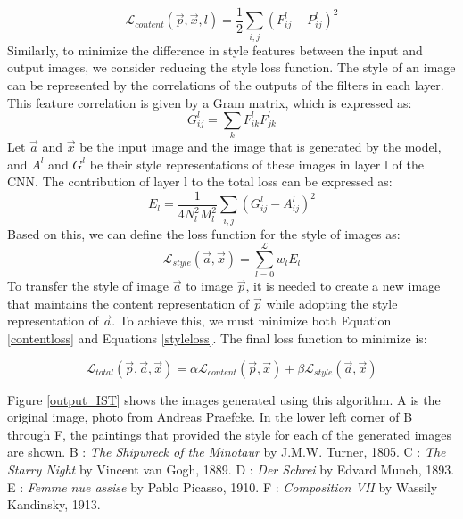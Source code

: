 \begin{equation}
    \label{contentloss}
    \mathcal{ L}_{content}(\vec{p}, \vec{x}, l)=\frac{1}{2} \sum_{i, j}\left(F_{i j}^l-P_{i j}^l\right)^2
\end{equation}
Similarly, to minimize the difference in style features between the input and
output images, we consider reducing the style loss function. The style of an 
image can be represented by the correlations of the outputs of the filters in 
each layer. This feature correlation is given by a Gram matrix, which is 
expressed as:
\begin{equation}
    G_{i j}^l = \sum_k F_{i k}^l F_{j k}^l 
\end{equation}
Let $\vec{a}$ and $\vec{x}$ be the input image and the image that is generated by
the model, and $A^l$ and $G^l$ be their style representations of these images in 
layer l of the CNN. The contribution of layer l to the total loss can be 
expressed as:
\begin{equation}
    E_l=\frac{1}{4 N_l^2 M_l^2} \sum_{i, j}\left(G_{i j}^l-A_{i j}^l\right)^2
\end{equation}
Based on this, we can define the loss function for the style of images as:
\begin{equation}
    \label{styleloss}
    \mathcal{ L}_{style}(\vec{a}, \vec{x})=\sum_{l=0}^\mathcal{ L}w_{l}E_{l}
\end{equation}
To transfer the style of image $\vec{a}$ to image $\vec{p}$, it is needed to 
create a new image that maintains the content representation of $\vec{p}$ 
while adopting the style representation of $\vec{a}$. To achieve this, we must 
minimize both Equation \ref{contentloss} and Equations \ref{styleloss}.
The final loss function to minimize is:

\begin{equation}
    \mathcal{ L}_{total}(\vec{p}, \vec{a}, \vec{x})=\alpha\mathcal{ L}_{content}(\vec{p}, \vec{x})+\beta\mathcal{ L}_{style}(\vec{a}, \vec{x})
\end{equation}


Figure \ref{output_IST} shows the images generated using this algorithm.
A is the original image, photo from Andreas Praefcke.
In the lower left corner of B through F, the paintings that provided the style 
for each of the generated images are shown.
B : \textit{The Shipwreck of the Minotaur} by J.M.W. Turner, 1805. 
C : \textit{The Starry Night} by Vincent van Gogh, 1889. 
D : \textit{Der Schrei} by Edvard Munch, 1893. 
E : \textit{Femme nue assise} by Pablo Picasso, 1910. 
F : \textit{Composition VII} by Wassily Kandinsky, 1913.

